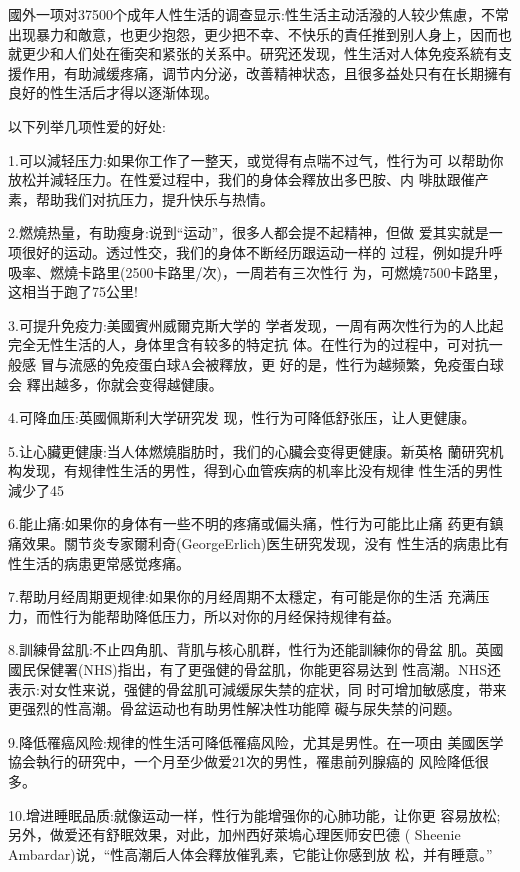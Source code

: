 \documentclass[12pt,UTF8]{ctexbook}
\begin{document}
國外一项对37500个成年人性生活的调查显示:性生活主动活潑的人较少焦慮，不常出现暴力和敵意，也更少抱怨，更少把不幸、不快乐的責任推到别人身上，因而也就更少和人们处在衝突和紧张的关系中。研究还发现，性生活对人体免疫系統有支援作用，有助減缓疼痛，调节内分泌，改善精神状态，且很多益处只有在长期擁有良好的性生活后才得以逐渐体现。

以下列举几项性爱的好处:

1.可以減轻压力:如果你工作了一整天，或觉得有点喘不过气，性行为可
以帮助你放松并減轻压力。在性爱过程中，我们的身体会釋放出多巴胺、内
啡肽跟催产素，帮助我们对抗压力，提升快乐与热情。

2.燃燒热量，有助瘦身:说到“运动”，很多人都会提不起精神，但做
爱其实就是一项很好的运动。透过性交，我们的身体不断经历跟运动一样的
过程，例如提升呼吸率、燃燒卡路里(2500卡路里/次)，一周若有三次性行
为，可燃燒7500卡路里，这相当于跑了75公里!

3.可提升免疫力:美國賓州威爾克斯大学的
学者发现，一周有两次性行为的人比起完全无性生活的人，身体里含有较多的特定抗
体。在性行为的过程中，可对抗一般感
冒与流感的免疫蛋白球A会被釋放，更
好的是，性行为越频繁，免疫蛋白球会
釋出越多，你就会变得越健康。

4.可降血压:英國佩斯利大学研究发
现，性行为可降低舒张压，让人更健康。

5.让心臟更健康:当人体燃燒脂肪时，我们的心臟会变得更健康。新英格
蘭研究机构发现，有规律性生活的男性，得到心血管疾病的机率比没有规律
性生活的男性減少了45%

6.能止痛:如果你的身体有一些不明的疼痛或偏头痛，性行为可能比止痛
药更有鎮痛效果。關节炎专家爾利奇(GeorgeErlich)医生研究发现，没有
性生活的病患比有性生活的病患更常感觉疼痛。

7.帮助月经周期更规律:如果你的月经周期不太穩定，有可能是你的生活
充满压力，而性行为能帮助降低压力，所以对你的月经保持规律有益。

8.訓練骨盆肌:不止四角肌、背肌与核心肌群，性行为还能訓練你的骨盆
肌。英國國民保健署(NHS)指出，有了更强健的骨盆肌，你能更容易达到
性高潮。NHS还表示:对女性来说，强健的骨盆肌可減缓尿失禁的症状，同
时可增加敏感度，带来更强烈的性高潮。骨盆运动也有助男性解决性功能障
礙与尿失禁的问题。

9.降低罹癌风险:规律的性生活可降低罹癌风险，尤其是男性。在一项由
美國医学協会執行的研究中，一个月至少做爱21次的男性，罹患前列腺癌的
风险降低很多。

10.增进睡眠品质:就像运动一样，性行为能增强你的心肺功能，让你更
容易放松;另外，做爱还有舒眠效果，对此，加州西好萊塢心理医师安巴德
( Sheenie Ambardar)说，“性高潮后人体会釋放催乳素，它能让你感到放
松，并有睡意。”
\end{document}
